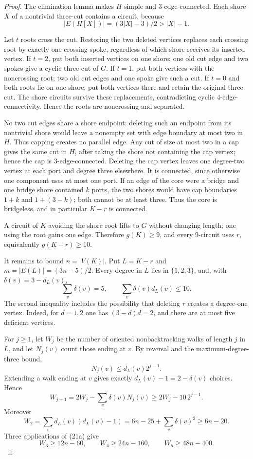 \documentclass[11pt]{article}
\theoremstyle{definition}
\theoremstyle{remark}
\begin{document}
\begin{proof}
The elimination lemma makes $H$ simple and $3$-edge-connected.  Each
shore $X$ of a nontrivial three-cut contains a circuit, because
\[
 |E(H[X])|=(3|X|-3)/2>|X|-1.
\]

Let $t$ roots cross the cut.  Restoring the two deleted vertices replaces
each crossing root by exactly one crossing spoke, regardless of which shore
receives its inserted vertex.  If $t=2$, put both inserted vertices on
one shore; one old cut edge and two spokes give a cyclic three-cut of $G$.
If $t=1$, put both vertices with the noncrossing root; two old cut edges
and one spoke give such a cut.  If $t=0$ and both roots lie on one shore,
put both vertices there and retain the original three-cut.  The shore
circuits survive these replacements, contradicting cyclic
$4$-edge-connectivity.  Hence the roots are noncrossing and separated.

No two cut edges share a shore endpoint: deleting such an endpoint from
its nontrivial shore would leave a nonempty set with edge boundary at most
two in $H$.  Thus capping creates no parallel edge.  Any cut of size at
most two in a cap gives the same cut in $H$, after taking the shore not
containing the cap vertex; hence the cap is $3$-edge-connected.  Deleting
the cap vertex leaves one degree-two vertex at each port and degree three
elsewhere.  It is connected, since otherwise one component uses at most one
port.  If an edge of the core were a bridge and one bridge shore contained
$k$ ports, the two shores would have cap boundaries $1+k$ and
$1+(3-k)$; both cannot be at least three.  Thus the core is bridgeless,
and in particular $K-r$ is connected.

A circuit of $K$ avoiding the shore root lifts to $G$ without changing
length; one using the root gains one edge.  Therefore $g(K)\geq9$, and
every 9-circuit uses $r$, equivalently $g(K-r)\geq10$.

It remains to bound $n=|V(K)|$.  Put $L=K-r$ and
$m=|E(L)|=(3n-5)/2$.  Every degree in $L$ lies in $\{1,2,3\}$, and, with
$\delta(v)=3-d_L(v)$,
\[
             \sum_v\delta(v)=5,
             \qquad \sum_v\delta(v)d_L(v)\leq10.          \tag{21}
\]
The second inequality includes the possibility that deleting $r$ creates
a degree-one vertex.  Indeed, for $d=1,2$ one has $(3-d)d=2$, and there
are at most five deficient vertices.

For $j\geq1$, let $W_j$ be the number of oriented nonbacktracking walks
of length $j$ in $L$, and let $N_j(v)$ count those ending at $v$.  By
reversal and the maximum-degree-three bound,
\[
                         N_j(v)\leq d_L(v)2^{j-1}.
\]
Extending a walk ending at $v$ gives exactly
$d_L(v)-1=2-\delta(v)$ choices.  Hence
\[
 W_{j+1}=2W_j-\sum_v\delta(v)N_j(v)
          \geq2W_j-10\,2^{j-1}.                          \tag{21a}
\]
Moreover
\[
 W_2=\sum_v d_L(v)(d_L(v)-1)
    =6n-25+\sum_v\delta(v)^2\geq6n-20.
\]
Three applications of (21a) give
\[
 W_3\geq12n-60,\qquad W_4\geq24n-160,
 \qquad W_5\geq48n-400.                                 \tag{21b}
\]


\end{proof}
\end{document}
